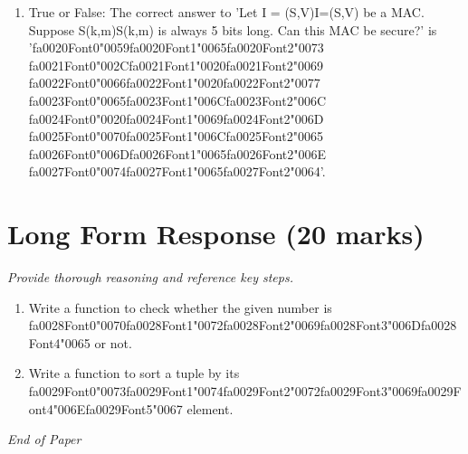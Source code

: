 \documentclass[12pt]{article}
\begin{document}
\begin{enumerate}[label=\arabic*.]
\item True or False: The correct answer to 'Let I = (S,V)I=(S,V) be a MAC. Suppose S(k,m)S(k,m) is always 5 bits long. Can this MAC be secure?' is '{\csname fa0020Font0\endcsname\char"0059}{\csname fa0020Font1\endcsname\char"0065}{\csname fa0020Font2\endcsname\char"0073} {\csname fa0021Font0\endcsname\char"002C}{\csname fa0021Font1\endcsname\char"0020}{\csname fa0021Font2\endcsname\char"0069} {\csname fa0022Font0\endcsname\char"0066}{\csname fa0022Font1\endcsname\char"0020}{\csname fa0022Font2\endcsname\char"0077} {\csname fa0023Font0\endcsname\char"0065}{\csname fa0023Font1\endcsname\char"006C}{\csname fa0023Font2\endcsname\char"006C} {\csname fa0024Font0\endcsname\char"0020}{\csname fa0024Font1\endcsname\char"0069}{\csname fa0024Font2\endcsname\char"006D} {\csname fa0025Font0\endcsname\char"0070}{\csname fa0025Font1\endcsname\char"006C}{\csname fa0025Font2\endcsname\char"0065} {\csname fa0026Font0\endcsname\char"006D}{\csname fa0026Font1\endcsname\char"0065}{\csname fa0026Font2\endcsname\char"006E} {\csname fa0027Font0\endcsname\char"0074}{\csname fa0027Font1\endcsname\char"0065}{\csname fa0027Font2\endcsname\char"0064}'.
\end{enumerate}

\section*{Long Form Response (20 marks)}
\textit{Provide thorough reasoning and reference key steps.}
\begin{enumerate}[label=\arabic*.]
\item Write a function to check whether the given number is {\csname fa0028Font0\endcsname\char"0070}{\csname fa0028Font1\endcsname\char"0072}{\csname fa0028Font2\endcsname\char"0069}{\csname fa0028Font3\endcsname\char"006D}{\csname fa0028Font4\endcsname\char"0065} or not.
\item Write a function to sort a tuple by its {\csname fa0029Font0\endcsname\char"0073}{\csname fa0029Font1\endcsname\char"0074}{\csname fa0029Font2\endcsname\char"0072}{\csname fa0029Font3\endcsname\char"0069}{\csname fa0029Font4\endcsname\char"006E}{\csname fa0029Font5\endcsname\char"0067} element.
\end{enumerate}

\vfill
\noindent\textit{End of Paper}
\end{document}
